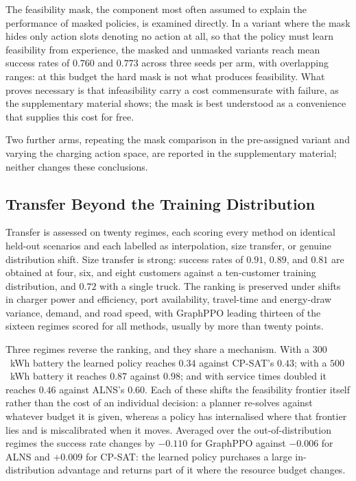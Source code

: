 \documentclass[journal]{IEEEtran}
\begin{document}
The feasibility mask, the component most often assumed to explain the performance of masked policies, is examined directly. In a variant where the mask hides only action slots denoting no action at all, so that the policy must learn feasibility from experience, the masked and unmasked variants reach mean success rates of $0.760$ and $0.773$ across three seeds per arm, with overlapping ranges:  at this budget the hard mask is not what produces feasibility. What proves necessary is that infeasibility carry a cost commensurate with failure, as the supplementary material shows; the mask is best understood as a convenience that supplies this cost for free. 

Two further arms, repeating the mask comparison in the pre-assigned variant and varying the charging action space, are reported in the supplementary material; neither changes these conclusions.

\subsection{Transfer Beyond the Training Distribution}\label{sec:transfer}

Transfer is assessed on twenty regimes, each scoring every method on identical held-out scenarios and each labelled as interpolation, size transfer, or genuine distribution shift. Size transfer is strong: success rates of $0.91$, $0.89$, and $0.81$ are obtained at four, six, and eight customers against a ten-customer training distribution, and $0.72$ with a single truck. The ranking is preserved under shifts in charger power and efficiency, port availability, travel-time and energy-draw variance, demand, and road speed, with GraphPPO leading thirteen of the sixteen regimes scored for all methods, usually by more than twenty points.

Three regimes reverse the ranking, and they share a mechanism. With a $300$~kWh battery the learned policy reaches $0.34$ against CP-SAT's $0.43$; with a $500$~kWh battery it reaches $0.87$ against $0.98$; and with service times doubled it reaches $0.46$ against ALNS's $0.60$. Each of these shifts the feasibility frontier itself rather than the cost of an individual decision: a planner re-solves against whatever budget it is given, whereas a policy has internalised where that frontier lies and is miscalibrated when it moves.  Averaged over the out-of-distribution regimes the success rate changes by $-0.110$ for GraphPPO against $-0.006$ for ALNS and $+0.009$ for CP-SAT: the learned policy purchases a large in-distribution advantage and returns part of it where the resource budget changes.
\end{document}
